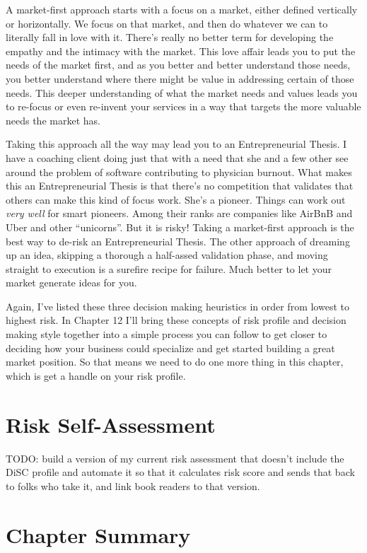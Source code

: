 A market-first approach starts with a focus on a market, either defined vertically or horizontally. We focus on that market, and then do whatever we can to literally fall in love with it. There's really no better term for developing the empathy and the intimacy with the market. This love affair leads you to put the needs of the market first, and as you better and better understand those needs, you better understand where there might be value in addressing certain of those needs. This deeper understanding of what the market needs and values leads you to re-focus or even re-invent your services in a way that targets the more valuable needs the market has.

Taking this approach all the way may lead you to an Entrepreneurial Thesis. I have a coaching client doing just that with a need that she and a few other see around the problem of software contributing to physician burnout. What makes this an Entrepreneurial Thesis is that there's no competition that validates that others can make this kind of focus work. She's a pioneer. Things can work out \emph{very well} for smart pioneers. Among their ranks are companies like AirBnB and Uber and other ``unicorns''. But it is risky! Taking a market-first approach is the best way to de-risk an Entrepreneurial Thesis. The other approach of dreaming up an idea, skipping a thorough a half-assed validation phase, and moving straight to execution is a surefire recipe for failure. Much better to let your market generate ideas for you.

Again, I've listed these three decision making heuristics in order from lowest to highest risk. In Chapter 12 I'll bring these concepts of risk profile and decision making style together into a simple process you can follow to get closer to deciding how your business could specialize and get started building a great market position. So that means we need to do one more thing in this chapter, which is get a handle on your risk profile.

\section{Risk Self-Assessment}

TODO: build a version of my current risk assessment that doesn't include the DiSC profile and automate it so that it calculates risk score and sends that back to folks who take it, and link book readers to that version.

\section{Chapter Summary}